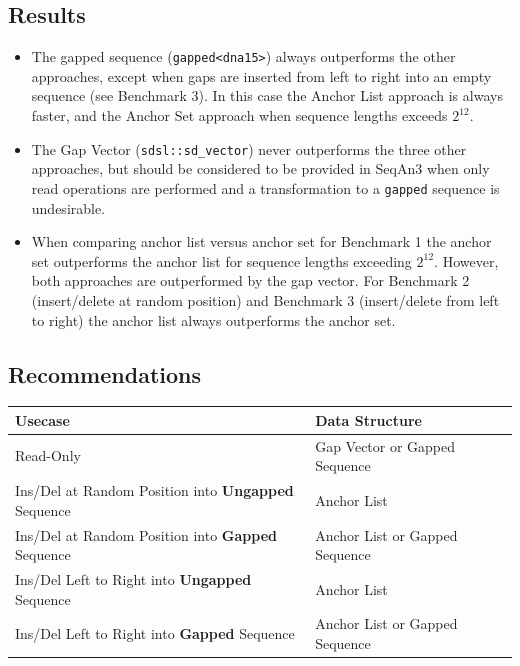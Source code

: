 \documentclass[11pt, letterpaper, twoside]{article}
\begin{document}
\subsection{Results}
\begin{itemize}
	\item The gapped sequence (\verb|gapped<dna15>|) always outperforms the other approaches, except when gaps are inserted from left to right into an empty sequence (see Benchmark 3). In this case the Anchor List approach is always faster, and the Anchor Set approach when sequence lengths exceeds $2^{12}$.
	\item The Gap Vector (\verb|sdsl::sd_vector|) never outperforms the three other approaches, but should be considered to be provided in SeqAn3 when only read operations are performed and a transformation to a \verb|gapped| sequence is undesirable. 
	\item When comparing anchor list versus anchor set for Benchmark 1 the anchor set outperforms the anchor list for sequence lengths exceeding $2^{12}$. However, both approaches are outperformed by the gap vector. For Benchmark 2 (insert/delete at random position) and Benchmark 3 (insert/delete from left to right) the anchor list always outperforms the anchor set.    
\end{itemize}

\subsection{Recommendations}
\begin{table}[htpb]\centering
\begin{tabular}{|l|l|l|}
\hline
\bf Usecase&\bf Data Structure\\
\hline
Read-Only&Gap Vector or Gapped Sequence\\
\hline
Ins/Del at Random Position into {\bf Ungapped} Sequence&Anchor List\\
\hline
Ins/Del at Random Position into {\bf Gapped} Sequence&Anchor List or Gapped Sequence\\
\hline
Ins/Del Left to Right into {\bf Ungapped} Sequence&Anchor List\\
\hline
Ins/Del Left to Right into {\bf Gapped} Sequence&Anchor List or Gapped Sequence\\
\hline
\end{tabular}
\end{table}
\end{document}
